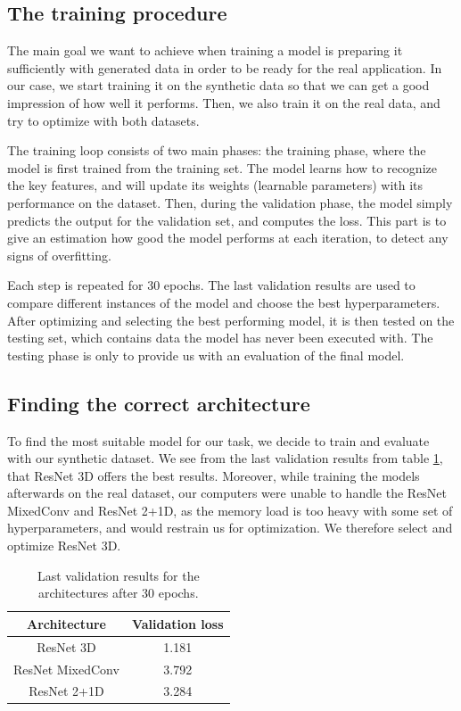 \documentclass[10pt,conference]{IEEEtran}
\begin{document}
\subsection{The training procedure}
The main goal we want to achieve when training a model is preparing it sufficiently with generated data in order to be ready for the real application. In our case, we start training it on the synthetic data so that we can get a good impression of how well it performs. Then, we also train it on the real data, and try to optimize with both datasets.\par
The training loop consists of two main phases: the training phase, where the model is first trained from the training set. The model learns how to recognize the key features, and will update its weights (learnable parameters) with its performance on the dataset. Then, during the validation phase, the model simply predicts the output for the validation set, and computes the loss. This part is to give an estimation how good the model performs at each iteration, to detect any signs of overfitting. \par

Each step is repeated for 30 epochs. The last validation results are used to compare different instances of the model and choose the best hyperparameters. After optimizing and selecting the best performing model, it is then tested on the testing set, which contains data the model has never been executed with. The testing phase is only to provide us with an evaluation of the final model.\par


\subsection{Finding the correct architecture}
To find the most suitable model for our task, we decide to train and evaluate with our synthetic dataset. We see from the last validation results from table \ref{table:comparisonLoss}, that ResNet 3D offers the best results. Moreover, while training the models afterwards on the real dataset, our computers were unable to handle the ResNet MixedConv and ResNet 2+1D, as the memory load is too heavy with some set of hyperparameters, and would restrain us for optimization. We therefore select and optimize ResNet 3D. 

\begin{table}[h!]
\centering
 \begin{tabular}{|c | c |} 
 \hline
    Architecture & Validation loss \\  
 \hline\hline
    ResNet 3D & 1.181\\ 
 \hline
    ResNet MixedConv & 3.792\\
 \hline
    ResNet 2+1D & 3.284\\
 \hline
\end{tabular}
\caption{Last validation results for the architectures after 30 epochs.}
\label{table:comparisonLoss}
\end{table}
\end{document}
